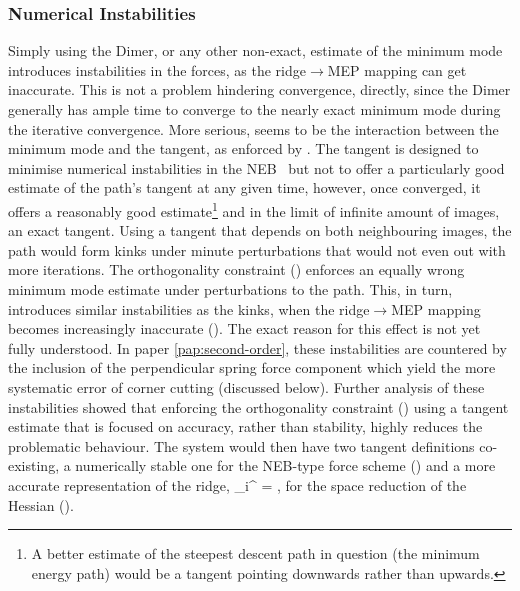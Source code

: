 \subsubsection{Numerical Instabilities}

Simply using the Dimer, or any other non-exact, estimate of the minimum mode introduces instabilities in the forces, as the ridge$\rightarrow$MEP mapping can get inaccurate.
This is not a problem hindering convergence, directly, since the Dimer generally has ample time to converge to the nearly exact minimum mode during the iterative convergence.
More serious, seems to be the interaction between the minimum mode and the tangent, as enforced by .
The tangent is designed to minimise numerical instabilities in the NEB~\cite{neb-tangent-2000} but not to offer a particularly good estimate of the path's tangent at any given time, however, once converged, it offers a reasonably good estimate\footnote{A better estimate of the steepest descent path in question (the minimum energy path) would be a tangent pointing downwards rather than upwards.} and in the limit of infinite amount of images, an exact tangent.
Using a tangent that depends on both neighbouring images, the path would form kinks under minute perturbations that would not even out with more iterations.
The orthogonality constraint () enforces an equally wrong minimum mode estimate under perturbations to the path.
This, in turn, introduces similar instabilities as the kinks, when the ridge$\rightarrow$MEP mapping becomes increasingly inaccurate ().
The exact reason for this effect is not yet fully understood.
In paper \ref{pap:second-order}, these instabilities are countered by the inclusion of the perpendicular spring force component which yield the more systematic error of corner cutting (discussed below).
Further analysis of these instabilities showed that enforcing the orthogonality constraint () using a tangent estimate that is focused on accuracy, rather than stability, highly reduces the problematic behaviour.
The system would then have two tangent definitions co-existing, a numerically stable one for the NEB-type force scheme () and a more accurate representation of the ridge,
\uvt_i^ = ,
\eeq
for the space reduction of the Hessian ().

